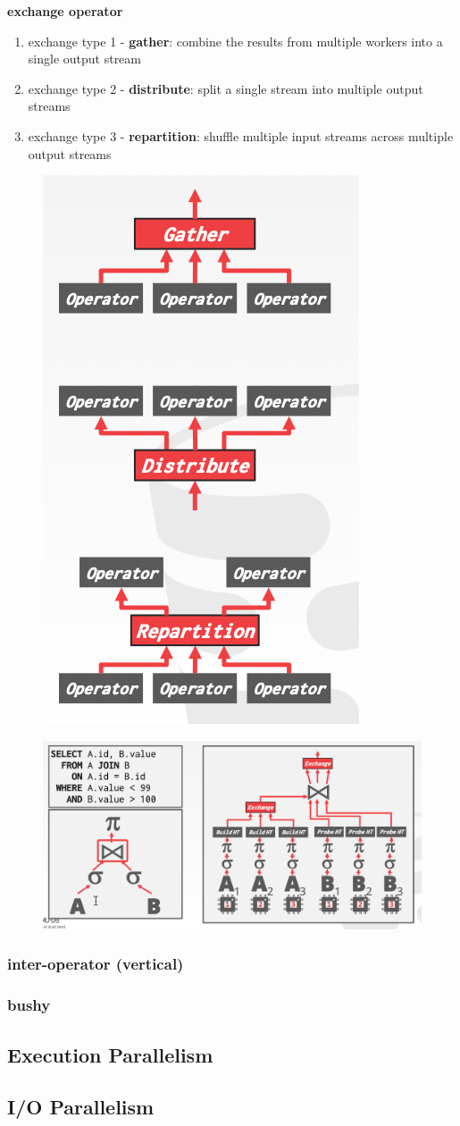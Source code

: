 \documentclass[11pt]{article}
\begin{document}
\textbf{exchange operator}
\begin{enumerate}
\item exchange type 1 - \textbf{gather}: combine the results from multiple workers into a single output stream
\item exchange type 2 - \textbf{distribute}: split a single stream into multiple output streams
\item exchange type 3 - \textbf{repartition}: shuffle multiple input streams across multiple output streams
\end{enumerate}

\begin{figure}[htbp]
\centering
\includegraphics[width=.4\textwidth]{../images/15445/32.png}
\label{}
\end{figure}

\begin{figure}[htbp]
\centering
\includegraphics[width=.7\textwidth]{../images/15445/33.png}
\label{}
\end{figure}
\subsubsection{inter-operator (vertical)}
\label{sec:org9022062}
\subsubsection{bushy}
\label{sec:org17e70ae}

\subsection{Execution Parallelism}
\label{sec:org497b64d}
\subsection{I/O Parallelism}
\label{sec:orge1dddd5}
\end{document}
